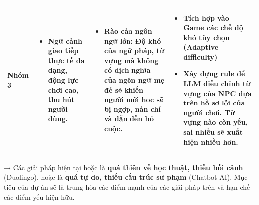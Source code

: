 \begin{table}[H]
\begin{tabularx}{\textwidth}{|l|X|X|X|}
\textbf{Nhóm 3} & 
\begin{itemize}[leftmargin=*, nosep]
    \item Ngữ cảnh giao tiếp thực tế đa dạng, động lực chơi cao, thu hút người dùng.
\end{itemize} & 
\begin{itemize}[leftmargin=*, nosep]
    \item Rào cản ngôn ngữ lớn: Độ khó của ngữ pháp, từ vựng mà không có dịch nghĩa của ngôn ngữ mẹ đẻ sẽ khiến người mới học sẽ bị ngợp, nản chí và dẫn đến bỏ cuộc.
\end{itemize} & 
\begin{itemize}[leftmargin=*, nosep]
    \item Tích hợp vào Game các chế độ khó tùy chọn (Adaptive difficulty)
    \item Xây dựng rule để LLM điều chỉnh từ vựng của NPC dựa trên hồ sơ lỗi của người chơi. Từ vựng nào còn yếu, sai nhiều sẽ xuất hiện nhiều hơn.
\end{itemize} \\ \hline
\end{tabularx}
\end{table}
→ Các giải pháp hiện tại hoặc là \textbf{quá thiên về học thuật, thiếu bối cảnh} (Duolingo), hoặc là \textbf{quá tự do, thiếu cấu trúc sư phạm} (Chatbot AI). Mục tiêu của dự án sẽ là trung hòa các điểm mạnh của các giải pháp trên và hạn chế các điểm yếu hiện hữu.

